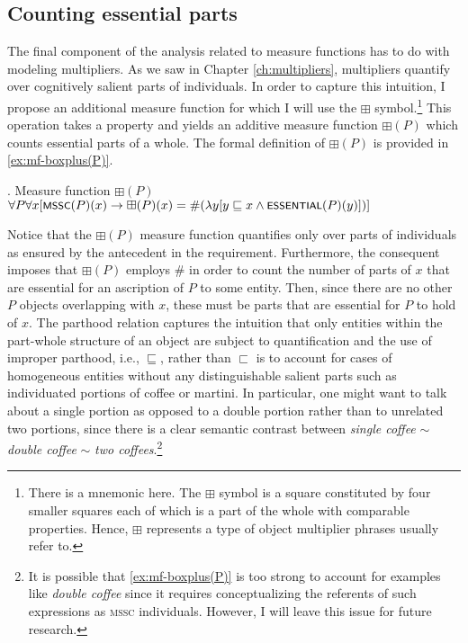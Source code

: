 	\subsection{Counting essential parts}\label{sec:counting-essential-parts}
	
	The final component of the analysis related to measure functions has to do with modeling multipliers. As we saw in Chapter \ref{ch:multipliers}, multipliers quantify over cognitively salient parts of individuals. In order to capture this intuition, I propose an additional measure function for which I will use the $\boxplus$ symbol.\footnote{There is a mnemonic here. The $\boxplus$ symbol is a square constituted by four smaller squares each of which is a part of the whole with comparable properties. Hence, $\boxplus$ represents a type of object multiplier phrases usually refer to.} This operation takes a property and yields an additive measure function $\boxplus(P)$ which counts essential parts of a whole. The formal definition of $\boxplus(P)$ is provided in \ref{ex:mf-boxplus(P)}.
	
	\ex. Measure function $\boxplus(P)$\\
    $\forall P\forall x[\cnst{mssc}(P)(x) \rightarrow \boxplus(P)(x) = \#(\lambda y[y \sqsubseteq x \wedge \cnst{essential}(P)(y)])]$\label{ex:mf-boxplus(P)}
	
	Notice that the $\boxplus(P)$ measure function quantifies only over parts of  individuals as ensured by the antecedent in the requirement. Furthermore, the consequent imposes that $\boxplus(P)$ employs $\#$ in order to count the number of parts of $x$ that are essential for an ascription of $P$ to some entity. Then, since there are no other $P$ objects overlapping with $x$, these must be parts that are essential for $P$ to hold of $x$. The parthood relation captures the intuition that only entities within the part-whole structure of an object are subject to quantification and the use of improper parthood, i.e., $\sqsubseteq$, rather than $\sqsubset$ is to account for cases of homogeneous entities without any distinguishable salient parts such as individuated portions of coffee or martini. In particular, one might want to talk about a single portion as opposed to a double portion rather than to unrelated two portions, since there is a clear semantic contrast between \textit{single coffee} $\sim$ \textit{double coffee} $\sim$ \textit{two coffees}.\footnote{It is possible that \ref{ex:mf-boxplus(P)} is too strong to account for examples like \textit{double coffee} since it requires conceptualizing the referents of such expressions as \textsc{mssc} individuals. However, I will leave this issue for future research.}
	
